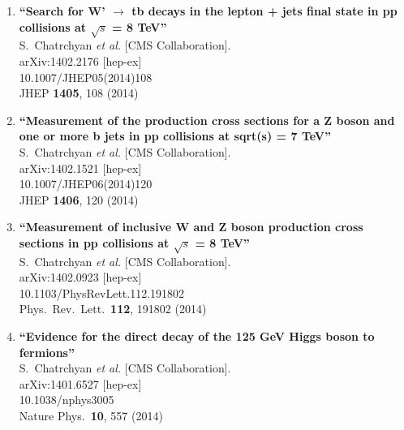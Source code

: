 \documentclass{article}
\begin{document}
\begin{enumerate}
\item%
{\bf ``Search for W' $\to $ tb decays in the lepton + jets final state in pp collisions at $\sqrt{s}$ = 8 TeV''}
  \\{}S.~Chatrchyan {\it et al.}  [CMS Collaboration].
  \\{}arXiv:1402.2176 [hep-ex]
    \\{}10.1007/JHEP05(2014)108
\\{}JHEP {\bf 1405}, 108 (2014) %


\item%
{\bf ``Measurement of the production cross sections for a Z boson and one or more b jets in pp collisions at sqrt(s) = 7 TeV''}
  \\{}S.~Chatrchyan {\it et al.}  [CMS Collaboration].
  \\{}arXiv:1402.1521 [hep-ex]
    \\{}10.1007/JHEP06(2014)120
\\{}JHEP {\bf 1406}, 120 (2014) %


\item%
{\bf ``Measurement of inclusive W and Z boson production cross sections in pp collisions at $\sqrt{s}$ = 8 TeV''}
  \\{}S.~Chatrchyan {\it et al.}  [CMS Collaboration].
  \\{}arXiv:1402.0923 [hep-ex]
    \\{}10.1103/PhysRevLett.112.191802
\\{}Phys.\ Rev.\ Lett.\  {\bf 112}, 191802 (2014) %


\item%
{\bf ``Evidence for the direct decay of the 125 GeV Higgs boson to fermions''}
  \\{}S.~Chatrchyan {\it et al.}  [CMS Collaboration].
  \\{}arXiv:1401.6527 [hep-ex]
    \\{}10.1038/nphys3005
\\{}Nature Phys.\  {\bf 10}, 557 (2014) %



\end{enumerate}
\end{document}
